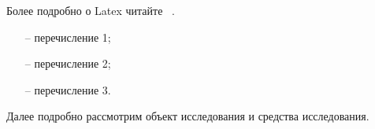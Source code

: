 \newpage
\introduce\label{section:Введение}

Более подробно о Latex читайте ~\cite{LatexБалдин,LatexКузнецов,LatexЛьвовский}.

\begin{enumerate}
\item[--] перечисление 1;
\item[--] перечисление 2;
\item[--] перечисление 3.
\end{enumerate}

Далее подробно рассмотрим объект исследования и средства исследования.